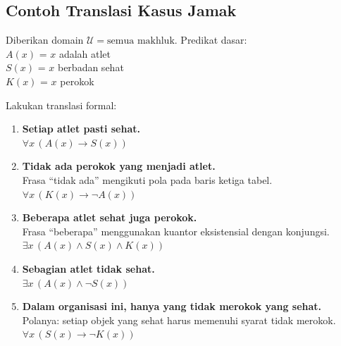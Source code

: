 \subsection{Contoh Translasi Kasus Jamak}

\begin{contoh}
Diberikan domain $\mathcal{U} = \text{semua makhluk}$. Predikat dasar: \\
$A(x)$ = $x$ adalah atlet \\
$S(x)$ = $x$ berbadan sehat \\
$K(x)$ = $x$ perokok

Lakukan translasi formal:
\begin{enumerate}
    \item \textbf{Setiap atlet pasti sehat.} \\
    $\forall x \, (A(x) \rightarrow S(x))$
    \item \textbf{Tidak ada perokok yang menjadi atlet.} \\
    Frasa ``tidak ada'' mengikuti pola pada baris ketiga tabel. \\
    $\forall x \, (K(x) \rightarrow \neg A(x))$
    \item \textbf{Beberapa atlet sehat juga perokok.} \\
    Frasa ``beberapa'' menggunakan kuantor eksistensial dengan konjungsi. \\
    $\exists x \, (A(x) \land S(x) \land K(x))$
    \item \textbf{Sebagian atlet tidak sehat.} \\
    $\exists x \, (A(x) \land \neg S(x))$
    \item \textbf{Dalam organisasi ini, hanya yang tidak merokok yang sehat.} \\
    Polanya: setiap objek yang sehat harus memenuhi syarat tidak merokok. \\
    $\forall x \, (S(x) \rightarrow \neg K(x))$
\end{enumerate}
\end{contoh}
